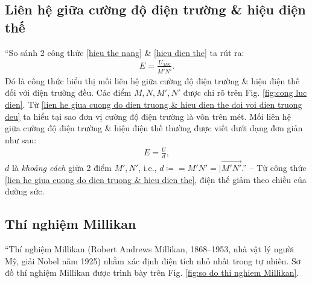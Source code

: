 \documentclass[oneside]{book}
\numberwithin{equation}{section}
\begin{document}
\subsection{Liên hệ giữa cường độ điện trường \& hiệu điện thế}
``So sánh 2 công thức \eqref{hieu the nang} \& \eqref{hieu dien the} ta rút ra:
\begin{align}
	\label{lien he giua cuong do dien truong & hieu dien the doi voi dien truong deu}
	E = \frac{U_{MN}}{\overline{M'N'}}.
\end{align}
Đó là công thức biểu thị mối liên hệ giữa cường độ điện trường \& hiệu điện thế đối với điện trường đều. Các điểm $M,N,M',N'$ được chỉ rõ trên Fig. \ref{fig:cong luc dien}. Từ \eqref{lien he giua cuong do dien truong & hieu dien the doi voi dien truong deu} ta hiểu tại sao đơn vị cường độ điện trường là vôn trên mét. Mối liên hệ giữa cường độ điện trường \& hiệu điện thế thường được viết dưới dạng đơn giản như sau:
\begin{align}
	\label{lien he giua cuong do dien truong & hieu dien the}
	E = \frac{U}{d},
\end{align}
$d$ là \textit{khoảng cách} giữa 2 điểm $M',N'$, i.e., $d\coloneqq = M'N' = |\overrightarrow{M'N'}$.'' -- \cite[pp. 21--22]{SGK_Vat_Ly_11_nang_cao} Từ công thức \eqref{lien he giua cuong do dien truong & hieu dien the}, điện thế giảm theo chiều của đường sức.

\subsection{Thí nghiệm Millikan}
``Thí nghiệm Millikan (Robert Andrews Millikan, 1868--1953, nhà vật lý người Mỹ, giải Nobel năm 1925) nhằm xác định điện tích nhỏ nhất trong tự nhiên. Sơ đồ thí nghiệm Millikan được trình bày trên Fig. \ref{fig:so do thi nghiem Millikan}.
\end{document}
